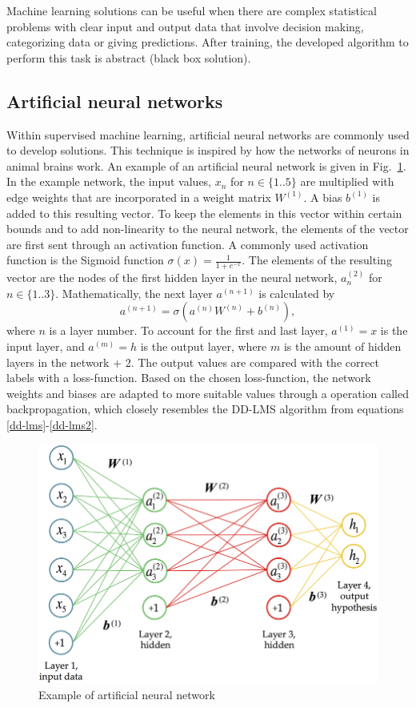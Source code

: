 \documentclass[journal,10pt,twoside, a4paper]{IEEEtran}
\begin{document}
Machine learning solutions can be useful when there are complex statistical problems with clear  input and output data that involve decision making, categorizing data or giving predictions. After training, the developed algorithm to perform this task is abstract (black box solution).

\subsection{Artificial neural networks}
Within supervised machine learning, artificial neural networks are commonly used to develop solutions. This technique is inspired by how the networks of neurons in animal brains work. An example of an artificial neural network is given in Fig.~\ref{fig:nn}. In the example network, the input values, $x_n$ for $n\in \{1..5\}$ are multiplied with edge weights that are incorporated in a weight matrix $W^{(1)}$. A bias $b^{(1)}$ is added to this resulting vector. To keep the elements in this vector within certain bounds and to add non-linearity to the neural network, the elements of the vector are first sent through an activation function. A commonly used activation function is the Sigmoid function $\sigma(x) = \frac{1}{1+e^{-x}}$. The elements of the resulting vector are the nodes of the first hidden layer in the neural network, $a_n^{(2)}$ for $n\in \{1..3\}$. Mathematically, the next layer $a^{(n+1)}$ is calculated by 
\begin{equation}
    a^{(n+1)} = \sigma\left(a^{(n)}W^{(n)}+b^{(n)}\right),
\end{equation}
where $n$ is a layer number. To account for the first and last layer, $a^{(1)} = x$ is the input layer, and $a^{(m)} = h$ is the output layer, where $m$ is the amount of hidden layers in the network + 2. The output values are compared with the correct labels with a loss-function. Based on the chosen loss-function, the network weights and biases are adapted to more suitable values through a operation called backpropagation\cite{backpropagation}, which closely resembles the DD-LMS algorithm from equations \ref{dd-lms}-\ref{dd-lms2}.

\begin{figure}
    \centering
    \includegraphics[width=\linewidth]{Thesis/images/nn.png}
    \caption{Example of artificial neural network}
    \label{fig:nn}
\end{figure}
\end{document}
